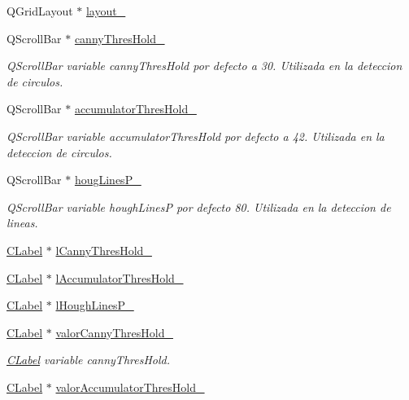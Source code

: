 \begin{DoxyCompactItemize}
\item 
Q\+Grid\+Layout $\ast$ \hyperlink{classCPanelOpciones_a28981752f19955ffe832f06c15bf77a2}{layout\+\_\+}
\item 
Q\+Scroll\+Bar $\ast$ \hyperlink{classCPanelOpciones_a02b5fec0793280de210c64541fc47155}{canny\+Thres\+Hold\+\_\+}
\begin{DoxyCompactList}\small\item\em Q\+Scroll\+Bar variable canny\+Thres\+Hold por defecto a 30. Utilizada en la deteccion de circulos. \end{DoxyCompactList}\item 
Q\+Scroll\+Bar $\ast$ \hyperlink{classCPanelOpciones_a1d0f21eb4ba18ebcfd6068817f17bef2}{accumulator\+Thres\+Hold\+\_\+}
\begin{DoxyCompactList}\small\item\em Q\+Scroll\+Bar variable accumulator\+Thres\+Hold por defecto a 42. Utilizada en la deteccion de circulos. \end{DoxyCompactList}\item 
Q\+Scroll\+Bar $\ast$ \hyperlink{classCPanelOpciones_a8e5bbb65d75f9dec3623b1796465c583}{houg\+Lines\+P\+\_\+}
\begin{DoxyCompactList}\small\item\em Q\+Scroll\+Bar variable hough\+LinesP por defecto 80. Utilizada en la deteccion de lineas. \end{DoxyCompactList}\item 
\hyperlink{classCLabel}{C\+Label} $\ast$ \hyperlink{classCPanelOpciones_a3e33ca18d2d53fe6317cebd3a6b20884}{l\+Canny\+Thres\+Hold\+\_\+}
\item 
\hyperlink{classCLabel}{C\+Label} $\ast$ \hyperlink{classCPanelOpciones_a1f50e0020b3c6012bda44fbe27069888}{l\+Accumulator\+Thres\+Hold\+\_\+}
\item 
\hyperlink{classCLabel}{C\+Label} $\ast$ \hyperlink{classCPanelOpciones_a189ea278f02a814eb10cc2b51c48a9c0}{l\+Hough\+Lines\+P\+\_\+}
\item 
\hyperlink{classCLabel}{C\+Label} $\ast$ \hyperlink{classCPanelOpciones_a09a2c503f1520a71866669fd84b95ebf}{valor\+Canny\+Thres\+Hold\+\_\+}
\begin{DoxyCompactList}\small\item\em \hyperlink{classCLabel}{C\+Label} variable canny\+Thres\+Hold. \end{DoxyCompactList}\item 
\hyperlink{classCLabel}{C\+Label} $\ast$ \hyperlink{classCPanelOpciones_a206f20e0afadfa1bfda3c59cd2ca16b2}{valor\+Accumulator\+Thres\+Hold\+\_\+}

\end{DoxyCompactItemize}
